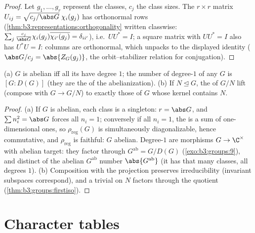 \begin{proof}
Let $g_1, \dots, g_r$ represent the classes, $c_j$ the class
sizes. The $r \times r$ matrix $U_{ij} =
\sqrt{c_j/\abs G}\;\chi_i(g_j)$ has orthonormal rows
(\cref{thm:b3:representations:orthogonality} written classwise:
$\sum_j \frac{c_j}{\abs G}\chi_i(g_j)\overline{\chi_{i'}(g_j)} =
\delta_{ii'}$), i.e.\ $UU^* = I$; a square matrix with $UU^* =
I$ also has $U^*U = I$: columns are orthonormal, which unpacks to
the displayed identity ($\abs G/c_j = \abs{Z_G(g_j)}$, the
orbit--stabilizer relation for conjugation).
\end{proof}

\begin{proposition}
\label{prop:b3:representations:onedim}
(a) $G$ is abelian iff all its  have
degree $1$; the number of degree-$1$  of any $G$ is
$[G : D(G)]$ (they are the  of the abelianization).
(b) If $N \trianglelefteq G$, the  of
$G/N$ lift (compose with $G \to G/N$) to exactly those
 of $G$ whose kernel contains $N$.
\end{proposition}

\begin{proof}
(a) If $G$ is abelian, each class is a singleton: $r = \abs G$,
and $\sum n_i^2 = \abs G$ forces all $n_i = 1$; conversely if
all $n_i = 1$, the  is a sum of
one-dimensional ones, so $\rho_{\mathrm{reg}}(G)$ is
simultaneously diagonalizable, hence commutative, and
$\rho_{\mathrm{reg}}$ is faithful: $G$ abelian. Degree-$1$
 are morphisms $G \to \C^\times$ with abelian
target: they factor through $G^{\mathrm{ab}} = G/D(G)$
(\cref{exo:b3:groups:9}), and distinct  of the abelian
$G^{\mathrm{ab}}$ number $\abs{G^{\mathrm{ab}}}$ (it has that
many classes, all degrees $1$). (b) Composition with the
projection preserves irreducibility (invariant subspaces
correspond), and a  trivial on $N$ factors through
the quotient (\cref{thm:b3:groups:firstiso}).
\end{proof}

\section{Character tables}

